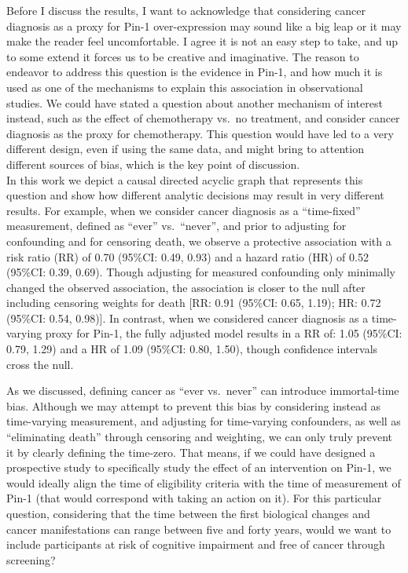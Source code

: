 \documentclass[
]{book}
\begin{document}
Before I discuss the results, I want to acknowledge that considering cancer diagnosis as a proxy for Pin-1 over-expression may sound like a big leap or it may make the reader feel uncomfortable. I agree it is not an easy step to take, and up to some extend it forces us to be creative and imaginative. The reason to endeavor to address this question is the evidence in Pin-1, and how much it is used as one of the mechanisms to explain this association in observational studies. We could have stated a question about another mechanism of interest instead, such as the effect of chemotherapy vs.~no treatment, and consider cancer diagnosis as the proxy for chemotherapy. This question would have led to a very different design, even if using the same data, and might bring to attention different sources of bias, which is the key point of discussion.\\
In this work we depict a causal directed acyclic graph that represents this question and show how different analytic decisions may result in very different results. For example, when we consider cancer diagnosis as a ``time-fixed'' measurement, defined as ``ever'' vs.~``never'', and prior to adjusting for confounding and for censoring death, we observe a protective association with a risk ratio (RR) of 0.70 (95\%CI: 0.49, 0.93) and a hazard ratio (HR) of 0.52 (95\%CI: 0.39, 0.69). Though adjusting for measured confounding only minimally changed the observed association, the association is closer to the null after including censoring weights for death {[}RR: 0.91 (95\%CI: 0.65, 1.19); HR: 0.72 (95\%CI: 0.54, 0.98){]}. In contrast, when we considered cancer diagnosis as a time-varying proxy for Pin-1, the fully adjusted model results in a RR of: 1.05 (95\%CI: 0.79, 1.29) and a HR of 1.09 (95\%CI: 0.80, 1.50), though confidence intervals cross the null.

As we discussed, defining cancer as ``ever vs.~never'' can introduce immortal-time bias. Although we may attempt to prevent this bias by considering instead as time-varying measurement, and adjusting for time-varying confounders, as well as ``eliminating death'' through censoring and weighting, we can only truly prevent it by clearly defining the time-zero. That means, if we could have designed a prospective study to specifically study the effect of an intervention on Pin-1, we would ideally align the time of eligibility criteria with the time of measurement of Pin-1 (that would correspond with taking an action on it). For this particular question, considering that the time between the first biological changes and cancer manifestations can range between five and forty years\autocite{zurbenko2012}, would we want to include participants at risk of cognitive impairment and free of cancer through screening?
\end{document}
